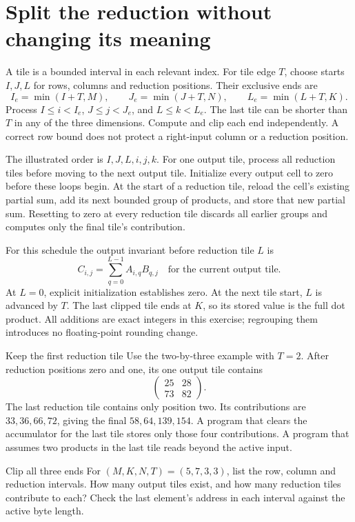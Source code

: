 \section{Split the reduction without changing its meaning}
A tile is a bounded interval in each relevant index. For tile edge \(T\), choose
starts \(I,J,L\) for rows, columns and reduction positions. Their exclusive ends are
\[
  I_e=\min(I+T,M),\qquad J_e=\min(J+T,N),\qquad L_e=\min(L+T,K).
\]
Process \(I\leq i<I_e\), \(J\leq j<J_e\), and \(L\leq k<L_e\).
The last tile can be shorter than \(T\) in any of the three dimensions.
Compute and clip each end independently. A correct row bound does not protect a
right-input column or a reduction position.

The illustrated order is \(I,J,L,i,j,k\). For one output tile, process all
reduction tiles before moving to the next output tile. Initialize every output
cell to zero before these loops begin. At the start of a reduction tile, reload
the cell's existing partial sum, add its next bounded group of products, and store
that new partial sum. Resetting to zero at every reduction tile discards all earlier
groups and computes only the final tile's contribution.

For this schedule the output invariant before reduction tile \(L\) is
\[
  C_{i,j}=\sum_{q=0}^{L-1}A_{i,q}B_{q,j}
  \quad\text{for the current output tile.}
\]
At \(L=0\), explicit initialization establishes zero. At the next tile start,
\(L\) is advanced by \(T\). The last clipped tile ends at \(K\), so its stored
value is the full dot product. All additions are exact integers in this exercise;
regrouping them introduces no floating-point rounding change.

\begin{MARSWorkedExample}{Keep the first reduction tile}
  Use the two-by-three example with \(T=2\). After reduction positions zero and one,
  its one output tile contains
  \[
    \begin{pmatrix}25&28\\73&82\end{pmatrix}.
  \]
  The last reduction tile contains only position two. Its contributions are
  \(33,36,66,72\), giving the final \(58,64,139,154\). A program that clears the
  accumulator for the last tile stores only those four contributions. A program that
  assumes two products in the last tile reads beyond the active input.
\end{MARSWorkedExample}

\begin{MARSExercise}{Clip all three ends}
  For \((M,K,N,T)=(5,7,3,3)\), list the row, column and reduction intervals. How many
  output tiles exist, and how many reduction tiles contribute to each? Check the
  last element's address in each interval against the active byte length.
\end{MARSExercise}
